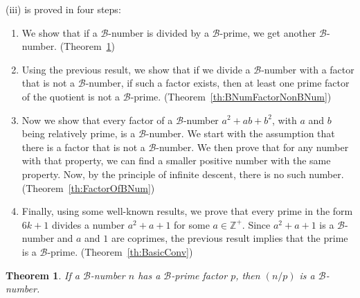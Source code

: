 \documentclass[reqno]{amsart}
\newtheorem{theorem}{Theorem}
\newcommand{\bnum}   {\ensuremath{\mathcal B}-number}
\newcommand{\bprime} {\ensuremath{\mathcal B}-prime}
\newcommand{\bq}[2]{\ensuremath{{#1}^2 + {#1}{#2} + {#2}^2}}
\newcommand{\bqab}{\bq{a}{b}}
\newcommand{\Positive}{\ensuremath{\mathbb{Z^+}}}
\begin{document}
(iii) is proved in four steps:
\begin{enumerate}
\item We show that if a \bnum{} is divided by a \bprime{},
  we get another \bnum{}. (Theorem~\ref{th:BNumByBPrime})
\item Using the previous result, we show that if we divide a
  \bnum{} with a factor that is not a \bnum{}, if such a factor
  exists, then at least one prime factor of the quotient is
  not a \bprime. (Theorem~\ref{th:BNumFactorNonBNum})
\item Now we show that every factor of a \bnum{} \bqab{},
  with $a$ and $b$ being relatively prime, is a \bnum{}.  We start
  with the assumption that there is a factor that is not a
  \bnum{}.  We then prove that for any number with that
  property, we can find a smaller positive number with the
  same property.  Now, by the principle of infinite descent,
  there is no such number. (Theorem~\ref{th:FactorOfBNum})
\item Finally, using some well-known results, we prove that
  every prime in the form $6k+1$ divides a number $a^2+a+1$
  for some $a \in \Positive$.  Since $a^2+a+1$ is a \bnum{} and $a$ and
  $1$ are coprimes, the previous result implies that the
  prime is a \bprime. (Theorem~\ref{th:BasicConv})
\end{enumerate}

\begin{theorem}
  \label{th:BNumByBPrime}
  If a \bnum{} $n$ has a \bprime{} factor $p$, then
  $(n/p)$ is a \bnum.
\end{theorem}
\end{document}
